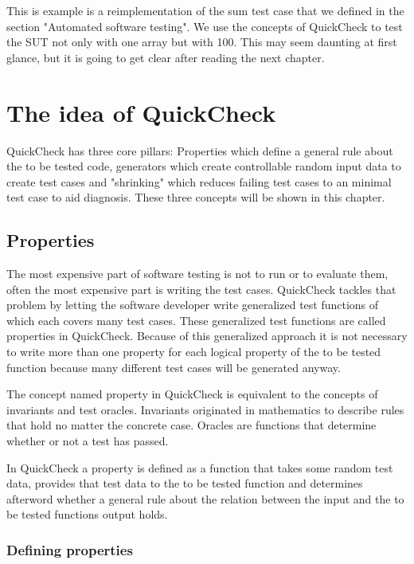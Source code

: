 \documentclass[a4paper, 12pt]{article} %
\begin{document}
This is example is a reimplementation of the sum test case that we defined in the section "Automated software testing". We use the concepts of QuickCheck to test the SUT not only with one array but with 100. This may seem daunting at first glance, but it is going to get clear after reading the next chapter.

\newpage
\section{The idea of QuickCheck}

QuickCheck has three core pillars: Properties which define a general rule about the to be tested code, generators which create controllable random input data to create test cases and "shrinking" which reduces failing test cases to an minimal test case to aid diagnosis. These three concepts will be shown in this chapter.

\subsection{Properties}

The most expensive part of software testing is not to run or to evaluate them, often the most expensive part is writing the test cases. QuickCheck tackles that problem by letting the software developer write generalized test functions of which each covers many test cases. These generalized test functions are called properties in QuickCheck. \cite{Hughes2010} Because of this generalized approach it is not necessary to write more than one property for each logical property of the to be tested function because many different test cases will be generated anyway. \cite{Hughes2006}

The concept named property in QuickCheck is equivalent to the concepts of invariants and test oracles. Invariants originated in mathematics to describe rules that hold no matter the concrete case. Oracles are functions that determine whether or not a test has passed.

In QuickCheck a property is defined as a function that takes some random test data, provides that test data to the to be tested function and determines afterword whether a general rule about the relation between the input and the to be tested functions output holds.

\subsubsection{Defining properties}
\end{document}
